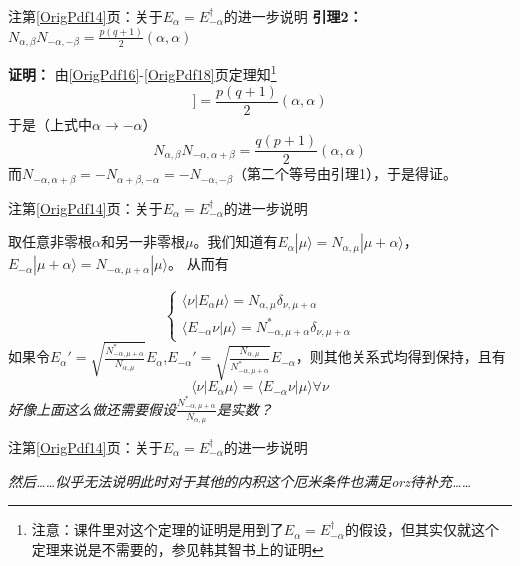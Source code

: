 \documentclass{beamer}
\newcommand{\refpage}[1]{注第\ref{OrigPdf#1}页}%
\newcommand{\refpageN}[1]{\ref{OrigPdf#1}}%
\begin{document}
\begin{frame}{\refpage{14}：关于$E_\alpha=E_{-\alpha}^\dagger$的进一步说明}
	\textbf{引理2：}$N_{\alpha,\beta}N_{-\alpha,-\beta}=\frac{p(q+1)}{2}(\alpha,\alpha)$
	
	\textbf{证明：} 由\refpageN{16}-\refpageN{18}页定理知\footnote{注意：课件里对这个定理的证明是用到了$E_\alpha=E_{-\alpha}^\dagger$的假设，但其实仅就这个定理来说是不需要的，参见韩其智书上的证明}
	\begin{equation*}
	[E_\alpha,[E_{-\alpha},E_\beta]]=\frac{p(q+1)}{2}(\alpha,\alpha)
	\end{equation*}
	于是（上式中$\alpha\to -\alpha$）
	\begin{equation*}
	N_{\alpha,\beta}N_{-\alpha,\alpha+\beta}=\frac{q(p+1)}{2}(\alpha,\alpha)
	\end{equation*}
	而$N_{-\alpha,\alpha+\beta}=-N_{\alpha+\beta,-\alpha}=-N_{-\alpha,-\beta}$（第二个等号由引理1），于是得证。
\end{frame}

\begin{frame}{\refpage{14}：关于$E_\alpha=E_{-\alpha}^\dagger$的进一步说明}

	取任意非零根$\alpha$和另一非零根$\mu$。我们知道有$E_\alpha|\mu\rangle=N_{\alpha,\mu}|\mu+\alpha\rangle$，$E_{-\alpha}|\mu+\alpha\rangle=N_{-\alpha,\mu+\alpha}|\mu\rangle$。
	从而有
	
	\begin{equation*}
	\begin{cases}
	\langle \nu | E_\alpha \mu \rangle=N_{\alpha,\mu}\delta_{\nu,\mu+\alpha}\\
	\langle E_{-\alpha} \nu | \mu \rangle=N_{-\alpha,\mu+\alpha}^*\delta_{\nu,\mu+\alpha}
	\end{cases}
	\end{equation*}
	如果令$E_\alpha'=\sqrt{\frac{N_{-\alpha,\mu+\alpha}^*}{N_{\alpha,\mu}}}E_\alpha$,$E_{-\alpha}'=\sqrt{\frac{N_{\alpha,\mu}}{N_{-\alpha,\mu+\alpha}^*}}E_{-\alpha}$，则其他关系式均得到保持，且有
	\begin{equation*}
	\langle \nu | E_{\alpha} \mu \rangle=\langle E_{-\alpha} \nu | \mu \rangle\forall \nu
	\end{equation*}
	\textit{好像上面这么做还需要假设$\frac{N_{-\alpha,\mu+\alpha}^*}{N_{\alpha,\mu}}$是实数？}
	
\end{frame}

\begin{frame}{\refpage{14}：关于$E_\alpha=E_{-\alpha}^\dagger$的进一步说明}
	
	\textit{然后……似乎无法说明此时对于其他的内积这个厄米条件也满足orz待补充……}
	
\end{frame}
\end{document}
